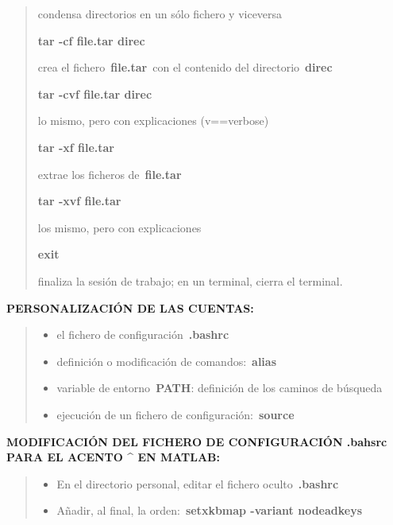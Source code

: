 \documentclass[
  letterpaper,
]{article}
\providecommand{\tightlist}{%
  \setlength{\itemsep}{0pt}\setlength{\parskip}{0pt}}\usepackage{longtable,booktabs,array}
\begin{document}
\begin{quote}
condensa directorios en un sólo fichero y viceversa

\textbf{tar -cf file.tar direc}

crea el fichero~\textbf{file.tar}~con el contenido del
directorio~\textbf{direc}

\textbf{tar -cvf file.tar direc}

lo mismo, pero con explicaciones (v==verbose)

\textbf{tar -xf file.tar}

extrae los ficheros de~\textbf{file.tar}

\textbf{tar -xvf file.tar}

los mismo, pero con explicaciones

\textbf{exit}

finaliza la sesión de trabajo; en un terminal, cierra el terminal.
\end{quote}

\textbf{PERSONALIZACIÓN DE LAS CUENTAS:}

\begin{quote}
\begin{itemize}
\tightlist
\item
  el fichero de configuración~\textbf{.bashrc}
\item
  definición o modificación de comandos:~\textbf{alias}
\item
  variable de entorno~\textbf{PATH}: definición de los caminos de
  búsqueda
\item
  ejecución de un fichero de configuración:~\textbf{source}
\end{itemize}
\end{quote}

\textbf{MODIFICACIÓN DEL FICHERO DE CONFIGURACIÓN .bahsrc PARA EL ACENTO
\^{} EN MATLAB:}

\begin{quote}
\begin{itemize}
\tightlist
\item
  En el directorio personal, editar el fichero oculto~\textbf{.bashrc}
\item
  Añadir, al final, la orden:~\textbf{setxkbmap -variant nodeadkeys}
\end{itemize}
\end{quote}


\printbibliography
\end{document}
